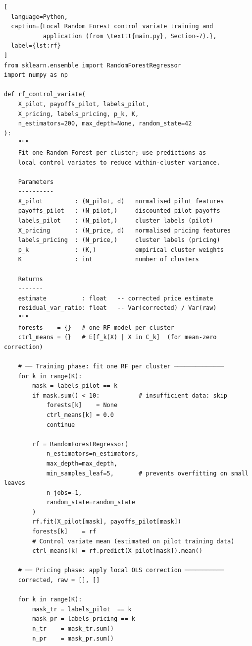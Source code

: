 \begin{lstlisting}[
  language=Python,
  caption={Local Random Forest control variate training and
           application (from \texttt{main.py}, Section~7).},
  label={lst:rf}
]
from sklearn.ensemble import RandomForestRegressor
import numpy as np

def rf_control_variate(
    X_pilot, payoffs_pilot, labels_pilot,
    X_pricing, labels_pricing, p_k, K,
    n_estimators=200, max_depth=None, random_state=42
):
    """
    Fit one Random Forest per cluster; use predictions as
    local control variates to reduce within-cluster variance.

    Parameters
    ----------
    X_pilot         : (N_pilot, d)   normalised pilot features
    payoffs_pilot   : (N_pilot,)     discounted pilot payoffs
    labels_pilot    : (N_pilot,)     cluster labels (pilot)
    X_pricing       : (N_price, d)   normalised pricing features
    labels_pricing  : (N_price,)     cluster labels (pricing)
    p_k             : (K,)           empirical cluster weights
    K               : int            number of clusters

    Returns
    -------
    estimate          : float   -- corrected price estimate
    residual_var_ratio: float   -- Var(corrected) / Var(raw)
    """
    forests    = {}   # one RF model per cluster
    ctrl_means = {}   # E[f_k(X) | X in C_k]  (for mean-zero correction)

    # ── Training phase: fit one RF per cluster ──────────────
    for k in range(K):
        mask = labels_pilot == k
        if mask.sum() < 10:           # insufficient data: skip
            forests[k]    = None
            ctrl_means[k] = 0.0
            continue

        rf = RandomForestRegressor(
            n_estimators=n_estimators,
            max_depth=max_depth,
            min_samples_leaf=5,       # prevents overfitting on small leaves
            n_jobs=-1,
            random_state=random_state
        )
        rf.fit(X_pilot[mask], payoffs_pilot[mask])
        forests[k]    = rf
        # Control variate mean (estimated on pilot training data)
        ctrl_means[k] = rf.predict(X_pilot[mask]).mean()

    # ── Pricing phase: apply local OLS correction ───────────
    corrected, raw = [], []

    for k in range(K):
        mask_tr = labels_pilot  == k
        mask_pr = labels_pricing == k
        n_tr    = mask_tr.sum()
        n_pr    = mask_pr.sum()


\end{lstlisting}
